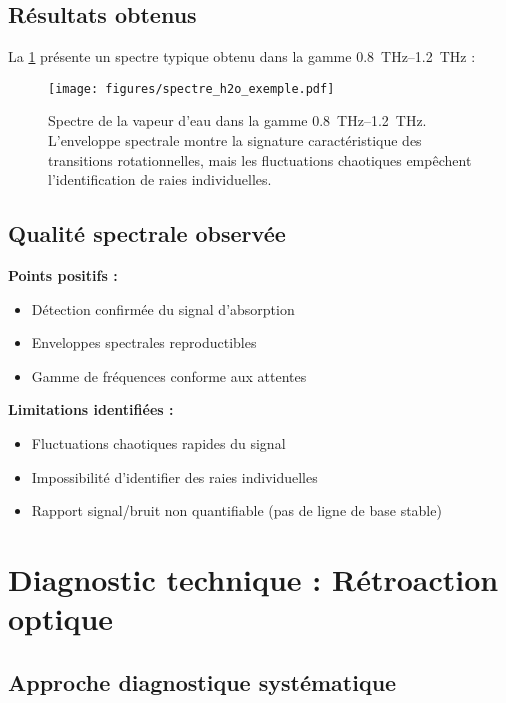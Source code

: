 \subsection{Résultats obtenus}

La \cref{fig:spectre_h2o} présente un spectre typique obtenu dans la gamme \SIrange{0.8}{1.2}{\THz} :

\begin{figure}[ht]
    \centering
    \texttt{[image: figures/spectre\_h2o\_exemple.pdf]}
    \caption{Spectre de la vapeur d'eau dans la gamme \SIrange{0.8}{1.2}{\THz}. L'enveloppe spectrale montre la signature caractéristique des transitions rotationnelles, mais les fluctuations chaotiques empêchent l'identification de raies individuelles.}
    \label{fig:spectre_h2o}
\end{figure}

\subsection{Qualité spectrale observée}

\textbf{Points positifs :}
\begin{itemize}
    \item Détection confirmée du signal d'absorption
    \item Enveloppes spectrales reproductibles
    \item Gamme de fréquences conforme aux attentes
\end{itemize}

\textbf{Limitations identifiées :}
\begin{itemize}
    \item Fluctuations chaotiques rapides du signal
    \item Impossibilité d'identifier des raies individuelles
    \item Rapport signal/bruit non quantifiable (pas de ligne de base stable)
\end{itemize}

\section{Diagnostic technique : Rétroaction optique}

\subsection{Approche diagnostique systématique}

